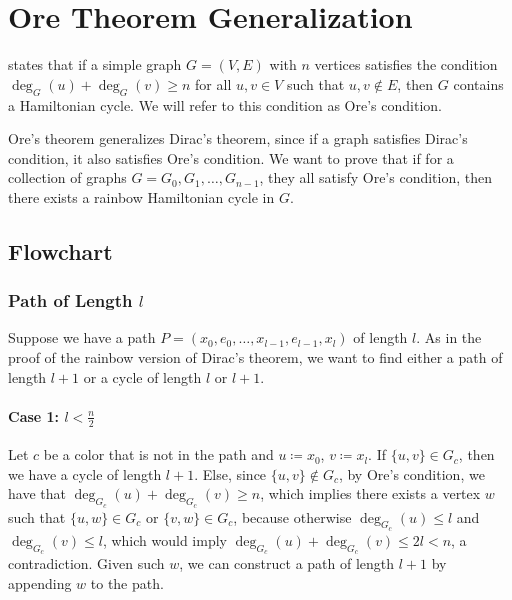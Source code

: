 
\chapter{Ore Theorem Generalization}

\cite{Ore_1960} states that if a simple graph $G = (V, E)$ with $n$ vertices satisfies the condition
$\deg_G(u) + \deg_G(v) \geq n$ for all $u, v \in V$ such that ${u, v} \not\in E$, then $G$ contains a Hamiltonian cycle.
We will refer to this condition as Ore's condition.

Ore's theorem generalizes Dirac's theorem, since if a graph satisfies Dirac's condition, it also satisfies Ore's condition.
We want to prove that if for a collection of graphs $G = {G_0, G_1, \ldots, G_{n-1}}$, they all satisfy Ore's condition,
then there exists a rainbow Hamiltonian cycle in $G$.

\section{Flowchart}

\subsection{Path of Length $l$}

Suppose we have a path $ P = (x_0, e_0, \dots, x_{l-1}, e_{l-1}, x_{l}) $ of length $ l $.
As in the proof of the rainbow version of Dirac's theorem,
we want to find either a path of length $ l+1 $ or a cycle of length $ l $ or $ l+1 $.

\subsubsection{Case 1: \( l < \frac{n}{2} \)}

Let \( c \) be a color that is not in the path and \(u \coloneqq x_0\), \(v \coloneqq x_{l}\). 
If \( \{u, v\} \in G_c \), then we have a cycle of length \( l+1 \).
Else, since \( \{u, v\} \not\in G_c \), by Ore's condition, 
we have that \( \deg_{G_c}(u) + \deg_{G_c}(v) \geq n \), which implies there exists a 
vertex \( w \) such that \( \{u, w\} \in G_c \) or \( \{v, w\} \in G_c \), because otherwise
\( \deg_{G_c}(u) \leq l  \) and \( \deg_{G_c}(v) \leq l \), 
which would imply \( \deg_{G_c}(u) + \deg_{G_c}(v) \leq 2l < n \), a contradiction.
Given such \(w\), we can construct a path of length \( l+1 \) by appending \(w\) to the path.

